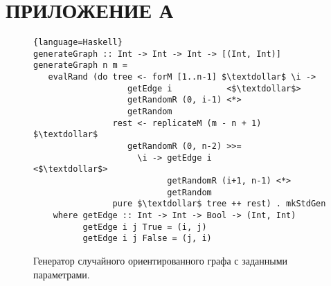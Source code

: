 \section*{ПРИЛОЖЕНИЕ А}

%
%


\begin{figure}[h!]
\begin{lstlisting}[basicstyle=\scriptsize]{language=Haskell}
generateGraph :: Int -> Int -> Int -> [(Int, Int)]
generateGraph n m =
   evalRand (do tree <- forM [1..n-1] $\textdollar$ \i ->
                   getEdge i           <$\textdollar$>
                   getRandomR (0, i-1) <*>
                   getRandom
                rest <- replicateM (m - n + 1) $\textdollar$
                   getRandomR (0, n-2) >>=
                     \i -> getEdge i             <$\textdollar$>
                           getRandomR (i+1, n-1) <*>
                           getRandom
                pure $\textdollar$ tree ++ rest) . mkStdGen
    where getEdge :: Int -> Int -> Bool -> (Int, Int)
          getEdge i j True = (i, j)
          getEdge i j False = (j, i)
\end{lstlisting}
\caption{Генератор случайного ориентированного графа с заданными параметрами.}
\label{fig:graphGen}
\end{figure}
